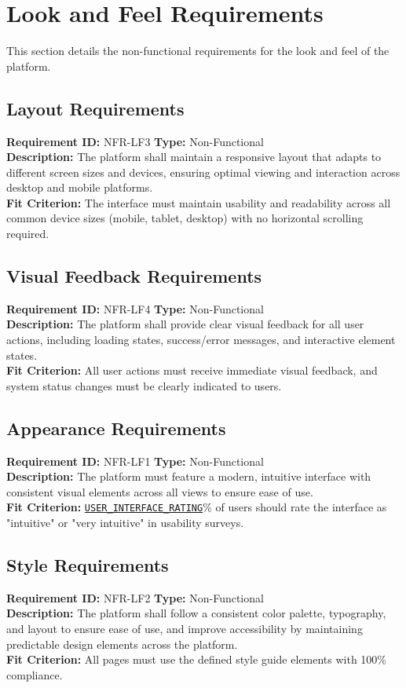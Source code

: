 \documentclass[12pt, titlepage]{article}
\begin{document}
\section{Look and Feel Requirements}
This section details the non-functional requirements for the look and feel of the platform.
\subsection{Layout Requirements}
\textbf{Requirement ID:} NFR-LF3 \quad \textbf{Type:} Non-Functional \\
\textbf{Description:} The platform shall maintain a responsive layout that adapts to different screen sizes and devices, ensuring optimal viewing and interaction across desktop and mobile platforms.\\
\textbf{Fit Criterion:} The interface must maintain usability and readability across all common device sizes (mobile, tablet, desktop) with no horizontal scrolling required.

\subsection{Visual Feedback Requirements}
\textbf{Requirement ID:} NFR-LF4 \quad \textbf{Type:} Non-Functional \\
\textbf{Description:} The platform shall provide clear visual feedback for all user actions, including loading states, success/error messages, and interactive element states.\\
\textbf{Fit Criterion:} All user actions must receive immediate visual feedback, and system status changes must be clearly indicated to users.


\subsection{Appearance Requirements}
\textbf{Requirement ID:} NFR-LF1 \quad \textbf{Type:} Non-Functional \\
\textbf{Description:} The platform must feature a modern, intuitive interface with consistent visual elements across all views to ensure ease of use.\\
\textbf{Fit Criterion:} \hyperref[USER_INTERFACE_RATING]{\texttt{USER\_INTERFACE\_RATING}}\% of users should rate the interface as "intuitive" or "very intuitive" in usability surveys.

\subsection{Style Requirements}
\textbf{Requirement ID:} NFR-LF2 \quad \textbf{Type:} Non-Functional \\
\textbf{Description:} The platform shall follow a consistent color palette, typography, and layout to ensure ease of use, and improve accessibility by maintaining predictable design elements across the platform.\\
\textbf{Fit Criterion:} All pages must use the defined style guide elements with 100\% compliance.
\end{document}

